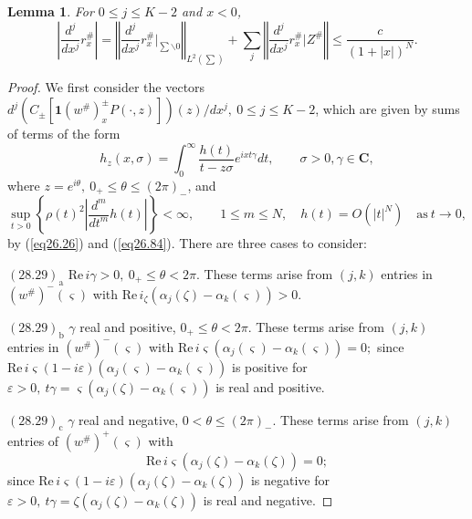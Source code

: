 \documentclass{surv-l}
\theoremstyle{plain}
\newtheorem{lem}[theorem]{Lemma}
\theoremstyle{definition}
\numberwithin{equation}{chapter}
\begin{document}
\setcounter{theorem}{25}
\begin{lem}\label{lem28.26} For $0\leq j\leq K-2$ and $x<0$,
\setcounter{equation}{26}
\begin{equation}\label{eq28.27}
\left|\frac{d^{j}}{d{x^{j}}}r_{x}^{\#}\right|=\left\Vert\frac{d^{j}}{d{x^{j}}}r_{x}^{\#}\Big|_{\sum\backslash 0}\right\Vert_{L^{2}(\sum)}+\sum_{j}\left\Vert\frac{d^{j}}{dx^{j}}r_{x}^{\#}\Big|Z^{\#}\right\Vert\leq\frac{c}{(1+|x|)^{N}}.
\end{equation}
\end{lem}

\begin{proof} We first consider the vectors $d^{j}(C_{\pm}[\mathbf{1}(w^{\#})_{x}^{\pm}P(\cdot,z)]) (z)/dx^{j},\  0\leq j\leq K-2$, which are given by sums of terms of the form
\begin{equation*}
h_{z}(x,\sigma)=\int_{0}^{\infty}\frac{h(t)}{t-z\sigma}e^{ixt\gamma}dt,\qquad \sigma>0,\gamma\in \mathbf{C},
\end{equation*}
where $z=e^{i\theta},\ 0_{+}\leq\theta\leq(2\pi)_{-}$, and
\begin{equation}
\sup_{t>0}\left\{\rho(t)^{2}\left|\frac{d^{m}}{dt^{m}}h(t)\right|\right\}<\infty,\qquad 1\leq m\leq N,\quad h(t)=O(|t|^{N})\quad \mathrm{as}\ t\rightarrow 0,
\end{equation}
by (\ref{eq26.26}) and (\ref{eq26.84}). There are three cases to consider:

$(28.29)_{\mathrm{a}}$ $\mathrm{Re}\, i\gamma>0,\  0_{+}\leq\theta<2\pi$. These terms arise from $(j, k)$ entries in $(w^{\#})^{-}(\varsigma)$ with $\mathrm{Re}\,i_{\zeta}(\alpha_{j}(\zeta)-\alpha_{k}(\varsigma))>0$.

$(28.29)_{\mathrm{b}}$ $\gamma$ real and positive, $0_{+}\leq\theta<2\pi$. These terms arise from $(j, k)$ entries in $(w^{\#})^{-}(\varsigma)$ with $\mathrm{Re}\, i{\varsigma}(\alpha_{j}(\varsigma)-\alpha_{k}(\varsigma))=0;$ since $\mathrm{Re}\, i{\varsigma}(1-i\varepsilon) (\alpha_{j}(\varsigma)-\alpha_{k}(\varsigma))$ is positive for $\varepsilon >0,\ t\gamma=\varsigma(\alpha_{j}(\zeta)-\alpha_{k}(\varsigma))$ is real and positive.

$(28.29)_{\mathrm{c}}$  $\gamma$ real and negative, $ 0<\theta\leq(2\pi)_{-}$. These terms arise from $(j, k)$ entries of $(w^{\#})^{+}(\varsigma)$ with
\begin{equation*}
\mathrm{Re}\, i{\varsigma}(\alpha_{j}(\zeta)-\alpha_{k}(\zeta))=0;
\end{equation*}
since $\mathrm{Re}\, i{\varsigma}(1-i\varepsilon)(\alpha_{j}(\zeta)-\alpha_{k}(\zeta))$ is negative for $\varepsilon >0,\ t\gamma=\zeta(\alpha_{j}(\zeta)-\alpha_{k}(\zeta))$ is real and negative.


\end{proof}
\end{document}
